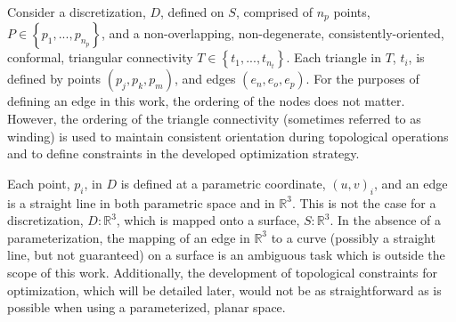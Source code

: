 Consider a discretization, $D$, defined on $S$, comprised of $n_p$
points, $P \in \left\{p_1,...,p_{n_p} \right\}$, and a non-overlapping,
non-degenerate, consistently-oriented, conformal, triangular
connectivity $T \in \left\{t_1,...,t_{n_t} \right\}$. Each triangle in
$T$, $t_i$, is defined by points $\left(p_j, p_k, p_m\right)$, and edges
$\left(e_n, e_o, e_p\right)$. For the purposes of defining an edge in this
work, the ordering of the nodes does not matter.  However, the ordering of the
triangle connectivity (sometimes referred to as winding) is used to maintain
consistent orientation during topological operations and to define constraints
in the developed optimization strategy.

Each point, $p_i$, in $D$ is defined at a parametric coordinate,
$\left(u,v\right)_i$, and an edge is a straight line in both parametric
space and in ${\mathbb R}^3$. This is not the case for a discretization,
$D:{\mathbb R}^3$, which is mapped onto a surface, $S:{\mathbb R}^3$. In the
absence of a parameterization, the mapping of an edge in ${\mathbb R}^3$ 
to a
curve (possibly a straight line, but not guaranteed) on a surface is an
ambiguous task which is outside the scope of this work.  Additionally, the
development of topological constraints for optimization, which will be detailed
later, would not be as straightforward as is possible when using a
parameterized, planar space.
